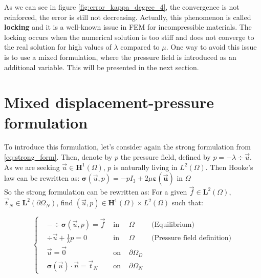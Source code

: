 \documentclass[a4paper,12pt,twoside]{report}
\begin{document}
As we can see in figure \ref{fig:error_kappa_degree_4}, the convergence is not reinforced, the error is still not decreasing. Actually, this phenomenon is called \textbf{locking} and it is a well-known issue in FEM for incompressible materials. The locking occurs when the numerical solution is too stiff and does not converge to the real solution for high values of $\lambda$ compared to $\mu$.
One way to avoid this issue is to use a mixed formulation, where the pressure field is introduced as an additional variable. This will be presented in the next section.

\section{Mixed displacement-pressure formulation}
To introduce this formulation, let's consider again the strong formulation from \eqref{eq:strong_form}. Then, denote by $p$ the pressure field, defined by $\displaystyle p = - \lambda \div{\vec u}$. As we are seeking $\vec u \in \boldsymbol{H}^1(\Omega)$, $p$ is naturally living in $L^2(\Omega)$. Then Hooke's law can be rewritten as: $\boldsymbol{\sigma} (\vec u,p) = -p I_3 + 2\mu \boldsymbol{\varepsilon(\vec u)} \text{ in }  \Omega $ \\
So the strong formulation can be rewritten as: For a given $\vec f \in \boldsymbol L^2(\Omega)$, $\vec t_N \in \boldsymbol L^2(\partial \Omega_N)$, find $(\vec u, p) \in \boldsymbol H^1(\Omega)\times L^2(\Omega)$ such that: 

\begin{tcolorbox}
\begin{equation}
	\label{eq:strong_pressure_disp_form}
	\left\{
	\begin{aligned}
		& - \div \boldsymbol{\sigma} (\vec u,p) = \vec f & \text{ in } & \Omega \hspace{1cm} \text{(Equilibrium)}\\
		& \div{\vec u} + \frac{1}{\lambda} p = 0 & \text{ in } & \Omega \hspace{1cm} \text{(Pressure field definition)} \\
		& \vec u = \vec 0 & \text{ on } &\partial \Omega_D \\
		& \boldsymbol{\sigma} (\vec u) \cdot \vec n = \vec t_N & \text{ on }& \partial \Omega_N
	\end{aligned}
	\right.
\end{equation}
\end{tcolorbox}
\end{document}
